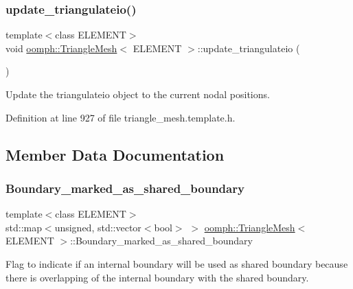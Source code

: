 \subsubsection{\texorpdfstring{update\+\_\+triangulateio()}{update\_triangulateio()}\hspace{0.1cm}{\footnotesize\ttfamily [2/2]}}
{\footnotesize\ttfamily template$<$class E\+L\+E\+M\+E\+NT$>$ \\
void \hyperlink{classoomph_1_1TriangleMesh}{oomph\+::\+Triangle\+Mesh}$<$ E\+L\+E\+M\+E\+NT $>$\+::update\+\_\+triangulateio (\begin{DoxyParamCaption}{ }\end{DoxyParamCaption})\hspace{0.3cm}{\ttfamily [inline]}}



Update the triangulateio object to the current nodal positions. 



Definition at line 927 of file triangle\+\_\+mesh.\+template.\+h.



\subsection{Member Data Documentation}
\mbox{\label{classoomph_1_1TriangleMesh_acd1571f3189dca349a49a8772cee21d6}} 
\subsubsection{\texorpdfstring{Boundary\+\_\+marked\+\_\+as\+\_\+shared\+\_\+boundary}{Boundary\_marked\_as\_shared\_boundary}}
{\footnotesize\ttfamily template$<$class E\+L\+E\+M\+E\+NT$>$ \\
std\+::map$<$unsigned, std\+::vector$<$bool$>$ $>$ \hyperlink{classoomph_1_1TriangleMesh}{oomph\+::\+Triangle\+Mesh}$<$ E\+L\+E\+M\+E\+NT $>$\+::Boundary\+\_\+marked\+\_\+as\+\_\+shared\+\_\+boundary\hspace{0.3cm}{\ttfamily [protected]}}



Flag to indicate if an internal boundary will be used as shared boundary because there is overlapping of the internal boundary with the shared boundary. 



